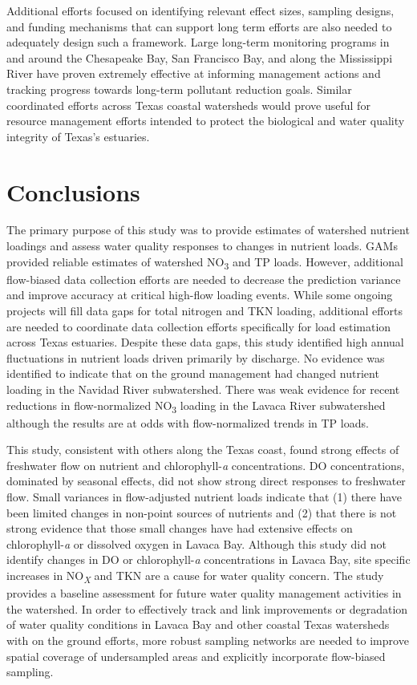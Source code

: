 \documentclass[fleqn,10pt,lineno]{wlpeerj} %
\begin{document}
Additional efforts focused on identifying relevant effect sizes,
sampling designs, and funding mechanisms that can support long term
efforts are also needed to adequately design such a framework. Large
long-term monitoring programs in and around the Chesapeake Bay, San
Francisco Bay, and along the Mississippi River have proven extremely
effective at informing management actions and tracking progress towards
long-term pollutant reduction goals. Similar coordinated efforts across
Texas coastal watersheds would prove useful for resource management
efforts intended to protect the biological and water quality integrity
of Texas's estuaries.

\hypertarget{conclusions}{%
\section*{Conclusions}\label{conclusions}}

The primary purpose of this study was to provide estimates of watershed
nutrient loadings and assess water quality responses to changes in
nutrient loads. GAMs provided reliable estimates of watershed
NO\textsubscript{3} and TP loads. However, additional flow-biased data
collection efforts are needed to decrease the prediction variance and
improve accuracy at critical high-flow loading events. While some
ongoing projects will fill data gaps for total nitrogen and TKN loading,
additional efforts are needed to coordinate data collection efforts
specifically for load estimation across Texas estuaries. Despite these
data gaps, this study identified high annual fluctuations in nutrient
loads driven primarily by discharge. No evidence was identified to
indicate that on the ground management had changed nutrient loading in
the Navidad River subwatershed. There was weak evidence for recent
reductions in flow-normalized NO\textsubscript{3} loading in the Lavaca
River subwatershed although the results are at odds with flow-normalized
trends in TP loads.

This study, consistent with others along the Texas coast, found strong
effects of freshwater flow on nutrient and chlorophyll-\emph{a}
concentrations. DO concentrations, dominated by seasonal effects, did
not show strong direct responses to freshwater flow. Small variances in
flow-adjusted nutrient loads indicate that (1) there have been limited
changes in non-point sources of nutrients and (2) that there is not
strong evidence that those small changes have had extensive effects on
chlorophyll-\emph{a} or dissolved oxygen in Lavaca Bay. Although this
study did not identify changes in DO or chlorophyll-\emph{a}
concentrations in Lavaca Bay, site specific increases in
NO\textsubscript{\emph{X}} and TKN are a cause for water quality
concern. The study provides a baseline assessment for future water
quality management activities in the watershed. In order to effectively
track and link improvements or degradation of water quality conditions
in Lavaca Bay and other coastal Texas watersheds with on the ground
efforts, more robust sampling networks are needed to improve spatial
coverage of undersampled areas and explicitly incorporate flow-biased
sampling.
\end{document}
